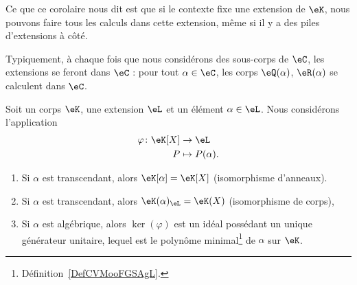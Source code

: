 Ce que ce corolaire nous dit est que si le contexte fixe une extension de \( \eK\), nous pouvons faire tous les calculs dans cette extension, même si il y a des piles d'extensions à côté.

Typiquement, à chaque fois que nous considérons des sous-corps de \( \eC\), les extensions se feront dans \( \eC\) : pour tout \( \alpha\in \eC\), les corps \( \eQ(\alpha)\), \( \eR(\alpha)\) se calculent dans \( \eC\).


\begin{proposition}     \label{PROPooSYQWooFbfQtm}
    Soit un corps \( \eK\), une extension \( \eL\) et un élément \( \alpha\in \eL\). Nous considérons l'application
    \begin{equation}
        \begin{aligned}
            \varphi\colon \eK[X]&\to \eL \\
            P&\mapsto P(\alpha).
        \end{aligned}
    \end{equation}
    \begin{enumerate}
        \item       \label{ITEMooUZDQooOasiRQ}
            Si \( \alpha\) est transcendant, alors \( \eK[\alpha]=\eK[X]\) (isomorphisme d'anneaux).
        \item
            Si \( \alpha\) est transcendant, alors \( \eK(\alpha)_{\eL}=\eK(X)\) (isomorphisme de corps),
        \item
            Si \( \alpha\) est algébrique, alors \( \ker(\varphi)\) est un idéal possédant un unique générateur unitaire, lequel est le polynôme minimal\footnote{Définition~\ref{DefCVMooFGSAgL}.} de \( \alpha\) sur \( \eK\).
    \end{enumerate}
\end{proposition}

